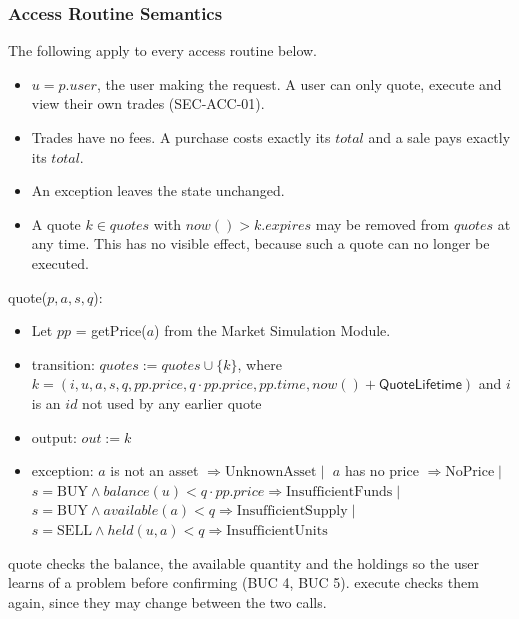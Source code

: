 \documentclass[12pt, titlepage]{article}
\begin{document}
\subsubsection{Access Routine Semantics}

\noindent The following apply to every access routine below.
\begin{itemize}
\item $u = p.\mathit{user}$, the user making the request. A user can only
  quote, execute and view their own trades (SEC-ACC-01).
\item Trades have no fees. A purchase costs exactly its $\mathit{total}$ and
  a sale pays exactly its $\mathit{total}$.
\item An exception leaves the state unchanged.
\item A quote $k \in \mathit{quotes}$ with $\mathit{now}() >
  k.\mathit{expires}$ may be removed from $\mathit{quotes}$ at any time. This
  has no visible effect, because such a quote can no longer be executed.
\end{itemize}

\medskip

\noindent quote($p, a, s, q$):
\begin{itemize}
\item Let $\mathit{pp}$ = getPrice($a$) from the Market Simulation Module.
\item transition: $\mathit{quotes} := \mathit{quotes} \cup \{k\}$, where
  $k = (i, u, a, s, q, \mathit{pp}.\mathit{price}, q \cdot
  \mathit{pp}.\mathit{price}, \mathit{pp}.\mathit{time}, \mathit{now}() +
  \textsf{QuoteLifetime})$ and $i$ is an $\mathit{id}$ not used by any
  earlier quote
\item output: $\mathit{out} := k$
\item exception: $a$ is not an asset $\Rightarrow \mathrm{UnknownAsset}
  \mid{}$ $a$ has no price $\Rightarrow \mathrm{NoPrice} \mid{}$ $s =
  \mathrm{BUY} \wedge \mathit{balance}(u) < q \cdot
  \mathit{pp}.\mathit{price} \Rightarrow \mathrm{InsufficientFunds} \mid{}$
  $s = \mathrm{BUY} \wedge \mathit{available}(a) < q \Rightarrow
  \mathrm{InsufficientSupply} \mid{}$
  $s = \mathrm{SELL} \wedge \mathit{held}(u, a) < q \Rightarrow
  \mathrm{InsufficientUnits}$
\end{itemize}

\noindent quote checks the balance, the available quantity and the
holdings so the user learns of a
problem before confirming (BUC 4, BUC 5). execute checks them again, since
they may change between the two calls.
\end{document}
